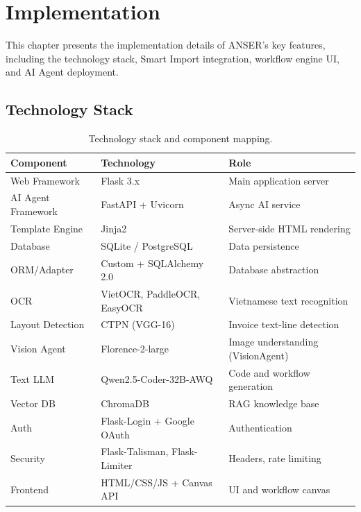 \documentclass[11pt,a4paper]{report}
\begin{document}
\chapter{Implementation}
\label{ch:implementation}

This chapter presents the implementation details of ANSER's key features, including the technology stack, Smart Import integration, workflow engine UI, and AI Agent deployment.

\section{Technology Stack}

\begin{table}[H]
\centering
\caption{Technology stack and component mapping.}
\label{tab:tech-stack}
\small
\begin{tabular}{lll}
\toprule
\textbf{Component} & \textbf{Technology} & \textbf{Role} \\
\midrule
Web Framework       & Flask 3.x~\cite{flask}        & Main application server \\
AI Agent Framework  & FastAPI + Uvicorn              & Async AI service \\
Template Engine     & Jinja2                         & Server-side HTML rendering \\
Database            & SQLite / PostgreSQL             & Data persistence \\
ORM/Adapter         & Custom + SQLAlchemy 2.0         & Database abstraction \\
OCR                 & VietOCR, PaddleOCR, EasyOCR     & Vietnamese text recognition \\
Layout Detection    & CTPN (VGG-16)~\cite{tian2016ctpn}  & Invoice text-line detection \\
Vision Agent       & Florence-2-large~\cite{florence2}  & Image understanding (VisionAgent) \\
Text LLM            & Qwen2.5-Coder-32B-AWQ          & Code and workflow generation \\
Vector DB           & ChromaDB~\cite{chromadb}        & RAG knowledge base \\
Auth                & Flask-Login + Google OAuth~\cite{googleapi} & Authentication \\
Security            & Flask-Talisman, Flask-Limiter    & Headers, rate limiting \\
Frontend            & HTML/CSS/JS + Canvas API         & UI and workflow canvas \\
\bottomrule
\end{tabular}
\end{table}
\end{document}
